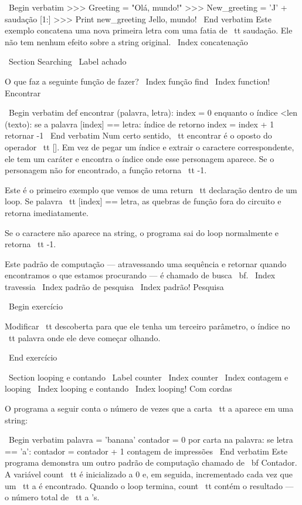\documentclass[10pt]{book}
\begin{document}
{{{{{\ Begin {verbatim}
>>> Greeting = "Olá, mundo!"
>>> New_greeting = 'J' + saudação [1:]
>>> Print new_greeting
Jello, mundo!
\ End {verbatim}
%
Este exemplo concatena uma nova primeira letra com
uma fatia de {\ tt saudação}. Ele não tem nenhum efeito sobre
a string original.
\ Index {concatenação}


\ Section {} Searching
\ Label {achado}

O que faz a seguinte função de fazer?
\ Index {função find}
\ Index {function! Encontrar}

\ Begin {verbatim}
def encontrar (palavra, letra):
    index = 0
    enquanto o índice <len (texto):
        se a palavra [index] == letra:
            índice de retorno
        index = index + 1
    retornar -1
\ End {verbatim}
%
Num certo sentido, {\ tt encontrar} é o oposto do operador {\ tt []}.
Em vez de pegar um índice e extrair o caractere correspondente,
ele tem um caráter e encontra o índice onde esse personagem
aparece. Se o personagem não for encontrado, a função retorna {\ tt
-1}.

Este é o primeiro exemplo que vemos de uma {return \ tt} declaração
dentro de um loop. Se {palavra \ tt [index] == letra}, as quebras de função
fora do circuito e retorna imediatamente.

Se o caractere não aparece na string, o programa
sai do loop normalmente e retorna {\ tt -1}.

Este padrão de computação --- atravessando uma sequência e retornar
quando encontramos o que estamos procurando --- é chamado de busca {\ bf}.
\ Index {travessia}
\ Index {padrão de pesquisa}
\ Index {padrão! Pesquisa}

\ Begin {} exercício

Modificar {\ tt descoberta} para que ele tenha um
terceiro parâmetro, o índice no {\ tt palavra} onde ele deve começar
olhando.

\ End {} exercício


\ Section {looping e contando}
\ Label {counter}
\ Index {counter}
\ Index {contagem e looping}
\ Index {looping e contando}
\ Index {looping! Com cordas}

O programa a seguir conta o número de vezes que a carta {\ tt a}
aparece em uma string:

\ Begin {verbatim}
palavra = 'banana'
contador = 0
por carta na palavra:
    se letra == 'a':
        contador = contador + 1
contagem de impressões
\ End {verbatim}
%
Este programa demonstra um outro padrão de computação chamado de {\ bf
Contador}. A variável {count \ tt} é inicializado a 0 e, em seguida,
incrementado cada vez que um {\ tt a} é encontrado.
Quando o loop termina, {count \ tt}
contém o resultado --- o número total de {\ tt a} 's.

}}}}}
\end{document}
